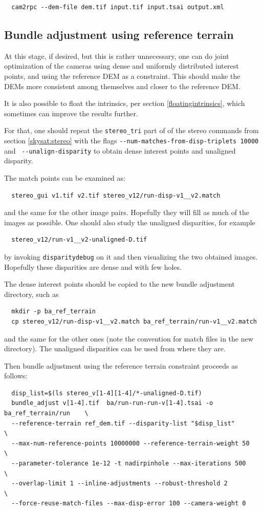 \begin{verbatim}
  cam2rpc --dem-file dem.tif input.tif input.tsai output.xml 
\end{verbatim}

\subsection{Bundle adjustment using reference terrain}

At this stage, if desired, but this is rather unnecessary, 
one can do joint optimization of the cameras using dense
and uniformly distributed interest points, and using the reference DEM as a constraint.
This should make the DEMs more consistent among themselves and closer to the reference DEM.

It is also possible to float the intrinsics, per section \ref{floatingintrinsics},
which sometimes can improve the results further. 

For that, one should repeat the \texttt{stereo\_tri} part of
of the stereo commands from section \ref{skysat:stereo}
with the flags 
\texttt{-\/-num-matches-from-disp-triplets 10000} and \
\texttt{-\/-unalign-disparity} to obtain dense interest points
and unaligned disparity. 

The match points can be examined as:
\begin{verbatim}
  stereo_gui v1.tif v2.tif stereo_v12/run-disp-v1__v2.match
\end{verbatim}
and the same for the other image pairs. Hopefully they will fill as much
of the images as possible. One should also study the unaligned disparities,
for example
\begin{verbatim}
  stereo_v12/run-v1__v2-unaligned-D.tif
\end{verbatim}
by invoking \texttt{disparitydebug} on it and then visualizing the two
obtained images. Hopefully these disparities are dense and with few holes. 

The dense interest points should be copied to the new bundle adjustment directory, such as
\begin{verbatim}
  mkdir -p ba_ref_terrain
  cp stereo_v12/run-disp-v1__v2.match ba_ref_terrain/run-v1__v2.match
\end{verbatim}

and the same for the other ones (note the convention for match files in the new directory).
The unaligned disparities can be used from where they are. 

Then bundle adjustment using the reference terrain constraint proceeds as follows:
\begin{verbatim}
  disp_list=$(ls stereo_v[1-4][1-4]/*-unaligned-D.tif)
  bundle_adjust v[1-4].tif  ba/run-run-run-v[1-4].tsai -o ba_ref_terrain/run    \
  --reference-terrain ref_dem.tif --disparity-list "$disp_list"                 \
  --max-num-reference-points 10000000 --reference-terrain-weight 50             \
  --parameter-tolerance 1e-12 -t nadirpinhole --max-iterations 500              \
  --overlap-limit 1 --inline-adjustments --robust-threshold 2                   \
  --force-reuse-match-files --max-disp-error 100 --camera-weight 0
\end{verbatim}

